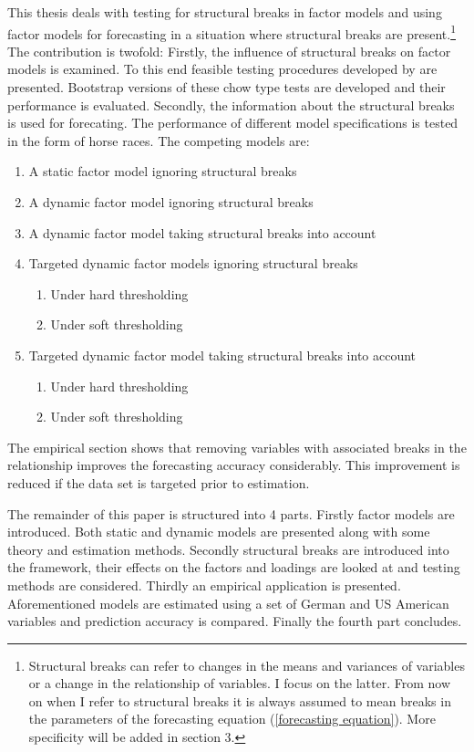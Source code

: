 \documentclass[12pt]{article}
\begin{document}
This thesis deals with testing for structural breaks in factor models and using factor models for forecasting in a situation where structural breaks are present.\footnote{Structural breaks can refer to changes in the means and variances of variables or a change in the relationship of variables. I focus on the latter. From now on when I refer to structural breaks it is always assumed to mean breaks in the parameters of the forecasting equation (\ref{forecasting equation}). More specificity will be added in section 3.} \\
The contribution is twofold: Firstly, the influence of structural breaks on factor models is examined. To this end feasible testing procedures developed by \citet{breitung2011testing} are presented. Bootstrap versions of these chow type tests are developed and their performance is evaluated. Secondly, the information about the structural breaks is used for forecating. The performance of different model specifications is tested in the form of horse races. The competing models are:

\begin{enumerate}
	\item A static factor model ignoring structural breaks
	\item A dynamic factor model ignoring structural breaks
	\item A dynamic factor model taking structural breaks into account
	\item Targeted dynamic factor models ignoring structural breaks
		\begin{enumerate}
			\item Under hard thresholding
			\item Under soft thresholding
		\end{enumerate}
	\item Targeted dynamic factor model taking structural breaks into account
		\begin{enumerate}
			\item Under hard thresholding
			\item Under soft thresholding
		\end{enumerate}
\end{enumerate}

The empirical section shows that removing variables with associated breaks in the relationship improves the forecasting accuracy considerably. This improvement is reduced if the data set is targeted prior to estimation.

The remainder of this paper is structured into 4 parts. Firstly factor models are introduced. Both static and dynamic models are presented along with some theory and estimation methods. Secondly structural breaks are introduced into the framework, their effects on the factors and loadings are looked at and testing methods are considered. Thirdly an empirical application is presented. Aforementioned models are estimated using a set of German and US American variables and prediction accuracy is compared. Finally the fourth part concludes. \\
\end{document}
